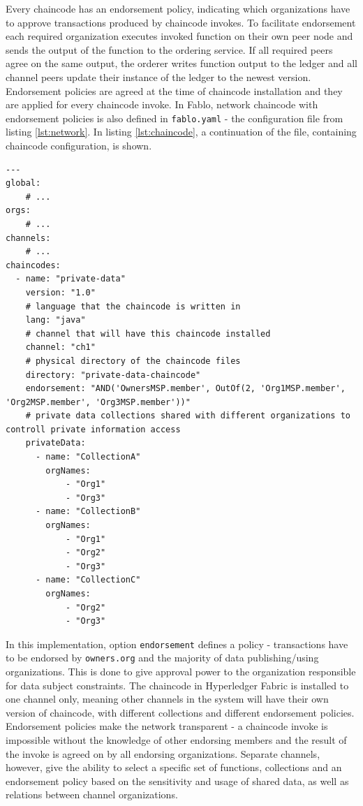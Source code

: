 \documentclass[12pt]{article}
\begin{document}
    Every chaincode has an endorsement policy, indicating which organizations have to approve transactions produced by chaincode invokes. To facilitate endorsement each required organization executes invoked function on their own peer node and sends the output of the function to the ordering service. If all required peers agree on the same output, the orderer writes function output to the ledger and all channel peers update their instance of the ledger to the newest version. Endorsement policies are agreed at the time of chaincode installation and they are applied for every chaincode invoke. In Fablo, network chaincode with endorsement policies is also defined in \lstinline{fablo.yaml} - the configuration file from listing \ref{lst:network}. In listing \ref{lst:chaincode}, a continuation of the file, containing chaincode configuration, is shown.

    \newpage
    \begin{lstlisting}[style=yaml,
        caption={fablo.yaml - configuration file defining network chaincode}, label={lst:chaincode}]
---
global:
    # ...
orgs:
    # ...
channels:
    # ...
chaincodes:
  - name: "private-data"
    version: "1.0"
    # language that the chaincode is written in
    lang: "java"
    # channel that will have this chaincode installed
    channel: "ch1"
    # physical directory of the chaincode files
    directory: "private-data-chaincode"
    endorsement: "AND('OwnersMSP.member', OutOf(2, 'Org1MSP.member', 'Org2MSP.member', 'Org3MSP.member'))"
    # private data collections shared with different organizations to controll private information access
    privateData:
      - name: "CollectionA"
        orgNames:
            - "Org1"
            - "Org3"
      - name: "CollectionB"
        orgNames:
            - "Org1"
            - "Org2"
            - "Org3"
      - name: "CollectionC"
        orgNames:
            - "Org2"
            - "Org3"
    \end{lstlisting}

    In this implementation, option \lstinline{endorsement} defines a policy - transactions have to be endorsed by \lstinline{owners.org} and the majority of data publishing/using organizations. This is done to give approval power to the organization responsible for data subject constraints. The chaincode in Hyperledger Fabric is installed to one channel only, meaning other channels in the system will have their own version of chaincode, with different collections and different endorsement policies. Endorsement policies make the network transparent - a chaincode invoke is impossible without the knowledge of other endorsing members and the result of the invoke is agreed on by all endorsing organizations. Separate channels, however, give the ability to select a specific set of functions, collections and an endorsement policy based on the sensitivity and usage of shared data, as well as relations between channel organizations.
\end{document}
